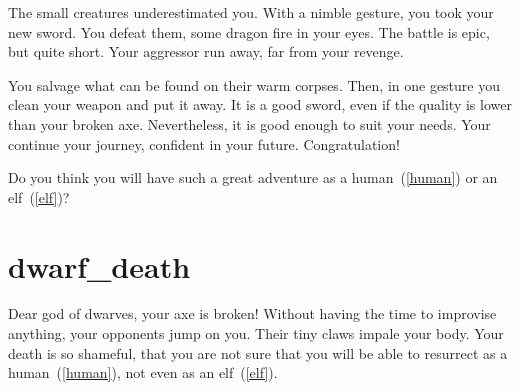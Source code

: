 The small creatures underestimated you. With a nimble gesture, you took your new
sword. You defeat them, some dragon fire in your eyes. The battle is epic, but
quite short. Your aggressor run away, far from your revenge.

You salvage what can be found on their warm corpses. Then, in one gesture you
clean your weapon and put it away. It is a good sword, even if the quality is
lower than your broken axe. Nevertheless, it is good enough to suit your needs.
Your continue your journey, confident in your future. Congratulation!

\medbreak

Do you think you will have such a great adventure as a human~(\ref{human}) or
an elf~(\ref{elf})?

\section{dwarf_death}

Dear god of dwarves, your axe is broken! Without having the time to improvise
anything, your opponents jump on you. Their tiny claws impale your body. Your
death is so shameful, that you are not sure that you will be able to resurrect as
a human~(\ref{human}), not even as an elf~(\ref{elf}).
